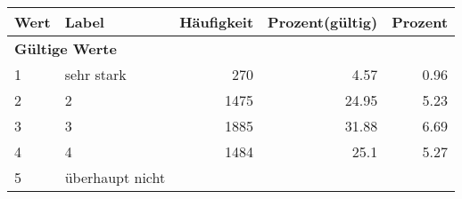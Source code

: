      \begin{longtable}{lXrrr}
     \toprule
     \textbf{Wert} & \textbf{Label} & \textbf{Häufigkeit} & \textbf{Prozent(gültig)} & \textbf{Prozent} \\
     \endhead
     \midrule
     \multicolumn{5}{l}{\textbf{Gültige Werte}}\\

     1 &
     \multicolumn{1}{X}{ sehr stark   } &


       \num{270} &
       \num[round-mode=places,round-precision=2]{4,57} &
         \num[round-mode=places,round-precision=2]{0,96} \\

     2 &
     \multicolumn{1}{X}{ 2   } &


       \num{1475} &
       \num[round-mode=places,round-precision=2]{24,95} &
         \num[round-mode=places,round-precision=2]{5,23} \\

     3 &
     \multicolumn{1}{X}{ 3   } &


       \num{1885} &
       \num[round-mode=places,round-precision=2]{31,88} &
         \num[round-mode=places,round-precision=2]{6,69} \\

     4 &
     \multicolumn{1}{X}{ 4   } &


       \num{1484} &
       \num[round-mode=places,round-precision=2]{25,1} &
         \num[round-mode=places,round-precision=2]{5,27} \\

     5 &
     \multicolumn{1}{X}{ überhaupt nicht   } &



\end{longtable}
